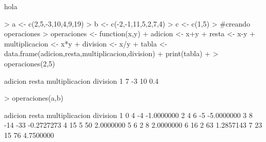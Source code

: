 \documentclass{article}
\begin{document}

hola

\begin{Schunk}
\begin{Sinput}
> a <- c(2,5,-3,10,4,9,19)
> b <- c(-2,-1,11,5,2,7,4)
> c <- c(1,5)
> #creando operaciones
> operaciones <- function(x,y){
+   adicion <- x+y
+   resta <- x-y
+   multiplicacion <- x*y
+   division <- x/y
+   tabla <- data.frame(adicion,resta,multiplicacion,division)
+   print(tabla)
+ }
> operaciones(2,5)
\end{Sinput}
\begin{Soutput}
  adicion resta multiplicacion division
1       7    -3             10      0.4
\end{Soutput}
\begin{Sinput}
> operaciones(a,b)
\end{Sinput}
\begin{Soutput}
  adicion resta multiplicacion   division
1       0     4             -4 -1.0000000
2       4     6             -5 -5.0000000
3       8   -14            -33 -0.2727273
4      15     5             50  2.0000000
5       6     2              8  2.0000000
6      16     2             63  1.2857143
7      23    15             76  4.7500000
\end{Soutput}
\end{Schunk}
\end{document}
